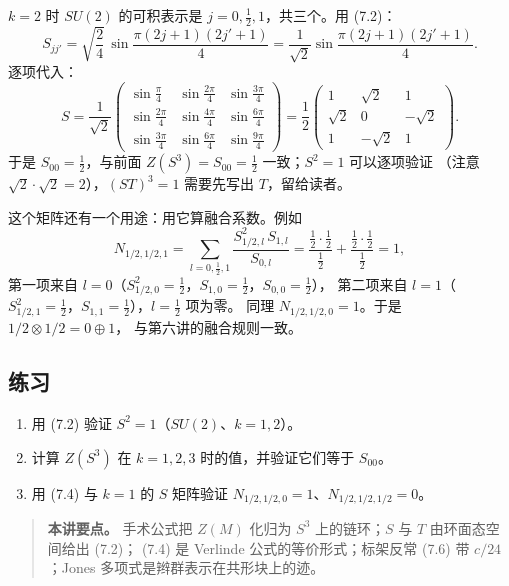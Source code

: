 $k=2$ 时 $SU(2)$ 的可积表示是 $j=0,\frac12,1$，共三个。用 (7.2)：
\[
S_{jj'}=\sqrt{\frac{2}{4}}\,\sin\frac{\pi(2j+1)(2j'+1)}{4}
=\frac{1}{\sqrt2}\sin\frac{\pi(2j+1)(2j'+1)}{4}.
\]
逐项代入：
\[
S=\frac{1}{\sqrt2}
\begin{pmatrix}
\sin\frac{\pi}{4} & \sin\frac{2\pi}{4} & \sin\frac{3\pi}{4}\\[2pt]
\sin\frac{2\pi}{4} & \sin\frac{4\pi}{4} & \sin\frac{6\pi}{4}\\[2pt]
\sin\frac{3\pi}{4} & \sin\frac{6\pi}{4} & \sin\frac{9\pi}{4}
\end{pmatrix}
=
\frac12
\begin{pmatrix}
1 & \sqrt2 & 1\\
\sqrt2 & 0 & -\sqrt2\\
1 & -\sqrt2 & 1
\end{pmatrix}.
\]
于是 $S_{00}=\frac12$，与前面 $Z(S^3)=S_{00}=\frac12$ 一致；$S^2=1$ 可以逐项验证
（注意 $\sqrt2\cdot\sqrt2=2$），$(ST)^3=1$ 需要先写出 $T$，留给读者。

这个矩阵还有一个用途：用它算融合系数。例如
\[
N_{1/2,1/2,1}=\sum_{l=0,\frac12,1}\frac{S_{1/2,l}^2\,S_{1,l}}{S_{0,l}}
=\frac{\tfrac12\cdot\tfrac12}{\tfrac12}+\frac{\tfrac12\cdot\tfrac12}{\tfrac12}=1,
\]
第一项来自 $l=0$（$S_{1/2,0}^2=\tfrac12$，$S_{1,0}=\tfrac12$，$S_{0,0}=\tfrac12$），
第二项来自 $l=1$（$S_{1/2,1}^2=\tfrac12$，$S_{1,1}=\tfrac12$），$l=\frac12$ 项为零。
同理 $N_{1/2,1/2,0}=1$。于是 $1/2\otimes1/2=0\oplus1$，
与第六讲的融合规则一致。

\subsection*{练习}
\begin{enumerate}[leftmargin=*]
  \item 用 (7.2) 验证 $S^2=1$（$SU(2)$、$k=1,2$）。
  \item 计算 $Z(S^3)$ 在 $k=1,2,3$ 时的值，并验证它们等于 $S_{00}$。
  \item 用 (7.4) 与 $k=1$ 的 $S$ 矩阵验证 $N_{1/2,1/2,0}=1$、$N_{1/2,1/2,1/2}=0$。
\end{enumerate}

\begin{quote}
\small
\textbf{本讲要点。} 手术公式把 $Z(M)$ 化归为 $S^3$ 上的链环；$S$ 与 $T$ 由环面态空间给出 (7.2)；
(7.4) 是 Verlinde 公式的等价形式；标架反常 (7.6) 带 $c/24$；Jones 多项式是辫群表示在共形块上的迹。
\end{quote}
